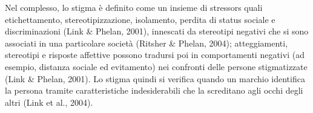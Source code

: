 Nel complesso, lo stigma è definito come un insieme di stressors quali etichettamento, stereotipizzazione, isolamento, perdita di status sociale e discriminazioni (Link \& Phelan, 2001), innescati da stereotipi negativi che si sono associati in una particolare società (Ritsher \& Phelan, 2004); atteggiamenti, stereotipi e risposte affettive possono tradursi poi in comportamenti negativi (ad esempio, distanza sociale ed evitamento) nei confronti delle persone stigmatizzate (Link \& Phelan, 2001). Lo stigma quindi si verifica quando un marchio identifica la persona tramite caratteristiche indesiderabili che la screditano agli occhi degli altri (Link et al., 2004).
